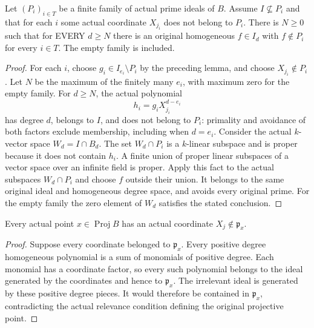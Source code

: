 \begin{theorem}
\label{thm:pl-gauss-eventual-homogeneous-prime-avoidance}
\leanok
Let $(P_i)_{i\in T}$ be a finite family of actual prime ideals of $B$.
Assume $I\not\subseteq P_i$ and that for each $i$ some actual coordinate
$X_{j_i}$ does not belong to $P_i$. There is $N\ge0$ such that for EVERY
$d\ge N$ there is an original homogeneous $f\in I_d$ with
$f\notin P_i$ for every $i\in T$. The empty family is included.
\end{theorem}
\begin{proof}
For each $i$, choose $g_i\in I_{e_i}\setminus P_i$ by the preceding
lemma, and choose $X_{j_i}\notin P_i$. Let $N$ be the maximum of the
finitely many $e_i$, with maximum zero for the empty family. For $d\ge N$,
the actual polynomial
\[
 h_i=g_iX_{j_i}^{d-e_i}
\]
has degree $d$, belongs to $I$, and does not belong to $P_i$: primality
and avoidance of both factors exclude membership, including when
$d=e_i$. Consider the actual $k$-vector space $W_d=I\cap B_d$.
The set $W_d\cap P_i$ is a $k$-linear subspace and is proper because it
does not contain $h_i$. A finite union of proper linear subspaces of a
vector space over an infinite field is proper. Apply this fact to the
actual subspaces $W_d\cap P_i$ and choose $f$ outside their union.
It belongs to the same original ideal and homogeneous degree space,
and avoids every original prime. For the empty family the zero element
of $W_d$ satisfies the stated conclusion.
\end{proof}

\begin{lemma}
\label{lem:pl-gauss-original-projective-point-coordinate}
\leanok
Every actual point $x\in\operatorname{Proj}B$ has an actual coordinate
$X_j\notin\mathfrak p_x$.
\end{lemma}
\begin{proof}
Suppose every coordinate belonged to $\mathfrak p_x$. Every positive
degree homogeneous polynomial is a sum of monomials of positive degree.
Each monomial has a coordinate factor, so every such polynomial belongs
to the ideal generated by the coordinates and hence to $\mathfrak p_x$.
The irrelevant ideal is generated by these positive degree pieces.
It would therefore be contained in $\mathfrak p_x$, contradicting the
actual relevance condition defining the original projective point.
\end{proof}


